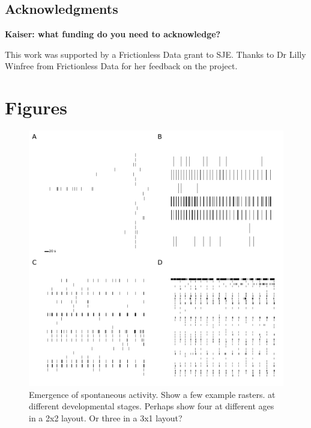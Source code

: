 \documentclass{bmcart}
\begin{document}
\begin{backmatter}

\subsection*{Acknowledgments}
\textbf{Kaiser: what funding do you need to acknowledge?}

This work was supported by a Frictionless Data grant to SJE\@.  Thanks
to Dr Lilly Winfree from Frictionless Data for her feedback on the
project.





\section*{Figures}
\begin{figure}[h!]
  \includegraphics{../plots/supplementary_figures/raster_plots.pdf}
  \caption{Emergence of spontaneous activity.  Show a few example rasters.
    at different developmental stages.  Perhaps show four at different
  ages in a 2x2 layout.  Or three in a 3x1 layout?}
  \label{fig:rasters}
\end{figure}


\end{backmatter}
\end{document}
